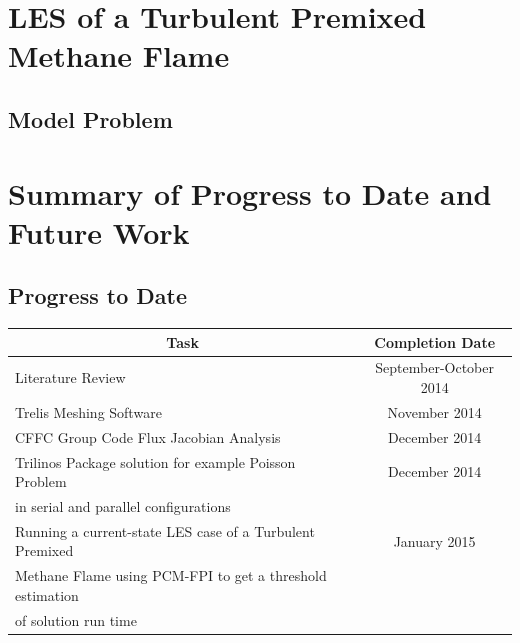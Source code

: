 \documentclass[titlepage,11pt,letterpaper]{article}
\begin{document}
\section{LES of a Turbulent Premixed Methane Flame}
\subsection{Model Problem}



\newpage
\section{Summary of Progress to Date and Future Work}

\subsection{Progress to Date}

\begin{tabular}{|l|c|} \hline
\multicolumn{1}{|c|}{\bf{Task}} & \multicolumn{1}{|c|}{\bf{Completion Date}} \\

\hline Literature Review & September-October 2014 \\

\hline Trelis Meshing Software & November 2014 \\

\hline CFFC Group Code Flux Jacobian Analysis & December 2014 \\

\hline Trilinos Package solution for example Poisson Problem & December 2014 \\in serial and parallel configurations & \\

\hline Running a current-state LES case of a Turbulent Premixed & January 2015 \\Methane Flame using PCM-FPI to get a threshold estimation & \\ of solution run time &\\

\hline
\end{tabular}
\end{document}
